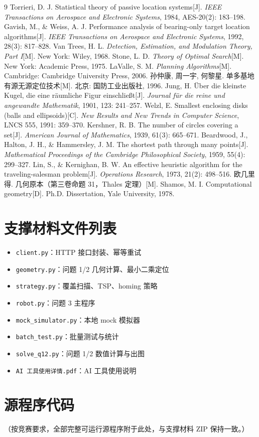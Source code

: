 \documentclass[12pt,a4paper]{ctexart}
\begin{document}
\begin{thebibliography}{9}
 Torrieri, D. J. Statistical theory of passive location systems[J]. \textit{IEEE Transactions on Aerospace and Electronic Systems}, 1984, AES-20(2): 183--198.
 Gavish, M., \& Weiss, A. J. Performance analysis of bearing-only target location algorithms[J]. \textit{IEEE Transactions on Aerospace and Electronic Systems}, 1992, 28(3): 817--828.
 Van Trees, H. L. \textit{Detection, Estimation, and Modulation Theory, Part I}[M]. New York: Wiley, 1968.
 Stone, L. D. \textit{Theory of Optimal Search}[M]. New York: Academic Press, 1975.
 LaValle, S. M. \textit{Planning Algorithms}[M]. Cambridge: Cambridge University Press, 2006.
 孙仲康, 周一宇, 何黎星. 单多基地有源无源定位技术[M]. 北京: 国防工业出版社, 1996.
 Jung, H. Über die kleinste Kugel, die eine räumliche Figur einschließt[J]. \textit{Journal für die reine und angewandte Mathematik}, 1901, 123: 241--257.
 Welzl, E. Smallest enclosing disks (balls and ellipsoids)[C]. \textit{New Results and New Trends in Computer Science}, LNCS 555, 1991: 359--370.
 Kershner, R. B. The number of circles covering a set[J]. \textit{American Journal of Mathematics}, 1939, 61(3): 665--671.
 Beardwood, J., Halton, J. H., \& Hammersley, J. M. The shortest path through many points[J]. \textit{Mathematical Proceedings of the Cambridge Philosophical Society}, 1959, 55(4): 299--327.
 Lin, S., \& Kernighan, B. W. An effective heuristic algorithm for the traveling-salesman problem[J]. \textit{Operations Research}, 1973, 21(2): 498--516.
 欧几里得. 几何原本（第三卷命题 31，Thales 定理）[M].
 Shamos, M. I. Computational geometry[D]. Ph.D. Dissertation, Yale University, 1978.
\end{thebibliography}

\appendix
\section{支撑材料文件列表}

\begin{itemize}
  \item \texttt{client.py}：HTTP 接口封装、幂等重试
  \item \texttt{geometry.py}：问题 1/2 几何计算、最小二乘定位
  \item \texttt{strategy.py}：覆盖扫描、TSP、homing 策略
  \item \texttt{robot.py}：问题 3 主程序
  \item \texttt{mock\_simulator.py}：本地 mock 模拟器
  \item \texttt{batch\_test.py}：批量测试与统计
  \item \texttt{solve\_q12.py}：问题 1/2 数值计算与出图
  \item \texttt{AI 工具使用详情.pdf}：AI 工具使用说明
\end{itemize}

\section{源程序代码}

（按竞赛要求，全部完整可运行源程序附于此处，与支撑材料 ZIP 保持一致。）
\end{document}
